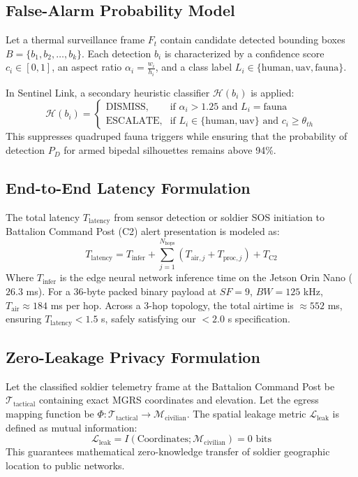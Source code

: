 \documentclass[conference]{IEEEtran}
\begin{document}
\subsection{False-Alarm Probability Model}
Let a thermal surveillance frame $F_t$ contain candidate detected bounding boxes $B = \{b_1, b_2, \dots, b_k\}$. Each detection $b_i$ is characterized by a confidence score $c_i \in [0, 1]$, an aspect ratio $\alpha_i = \frac{w_i}{h_i}$, and a class label $L_i \in \{\text{human}, \text{uav}, \text{fauna}\}$.

In Sentinel Link, a secondary heuristic classifier $\mathcal{H}(b_i)$ is applied:
\begin{equation}
\mathcal{H}(b_i) = \begin{cases} 
\text{DISMISS}, & \text{if } \alpha_i > 1.25 \text{ and } L_i = \text{fauna} \\
\text{ESCALATE}, & \text{if } L_i \in \{\text{human}, \text{uav}\} \text{ and } c_i \ge \theta_{th}
\end{cases}
\end{equation}
This suppresses quadruped fauna triggers while ensuring that the probability of detection $P_D$ for armed bipedal silhouettes remains above 94\%.

\subsection{End-to-End Latency Formulation}
The total latency $T_{\text{latency}}$ from sensor detection or soldier SOS initiation to Battalion Command Post (C2) alert presentation is modeled as:
\begin{equation}
T_{\text{latency}} = T_{\text{infer}} + \sum_{j=1}^{N_{\text{hops}}} \left( T_{\text{air}, j} + T_{\text{proc}, j} \right) + T_{\text{C2}}
\end{equation}
Where $T_{\text{infer}}$ is the edge neural network inference time on the Jetson Orin Nano ($26.3$ ms). For a 36-byte packed binary payload at $SF = 9$, $BW = 125$ kHz, $T_{\text{air}} \approx 184$ ms per hop. Across a 3-hop topology, the total airtime is $\approx 552$ ms, ensuring $T_{\text{latency}} < 1.5$ s, safely satisfying our $<2.0$ s specification.

\subsection{Zero-Leakage Privacy Formulation}
Let the classified soldier telemetry frame at the Battalion Command Post be $\mathcal{T}_{\text{tactical}}$ containing exact MGRS coordinates and elevation. Let the egress mapping function be $\Phi: \mathcal{T}_{\text{tactical}} \to \mathcal{M}_{\text{civilian}}$. The spatial leakage metric $\mathcal{L}_{\text{leak}}$ is defined as mutual information:
\begin{equation}
\mathcal{L}_{\text{leak}} = I(\text{Coordinates}; \mathcal{M}_{\text{civilian}}) = 0\text{ bits}
\end{equation}
This guarantees mathematical zero-knowledge transfer of soldier geographic location to public networks.
\end{document}
